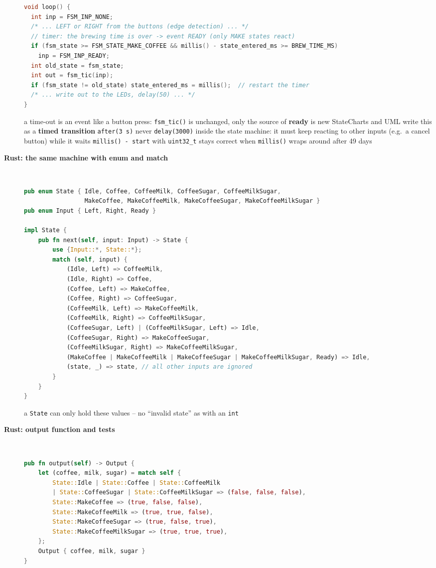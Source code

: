 \begin{description}
\begin{lstlisting}[language=C]
void loop() {
  int inp = FSM_INP_NONE;
  /* ... LEFT or RIGHT from the buttons (edge detection) ... */
  // timer: the brewing time is over -> event READY (only MAKE states react)
  if (fsm_state >= FSM_STATE_MAKE_COFFEE && millis() - state_entered_ms >= BREW_TIME_MS)
    inp = FSM_INP_READY;
  int old_state = fsm_state;
  int out = fsm_tic(inp);
  if (fsm_state != old_state) state_entered_ms = millis();  // restart the timer
  /* ... write out to the LEDs, delay(50) ... */
}
\end{lstlisting}
\bi
	\ite a time-out is an event like a button press: \texttt{fsm\_tic()} is unchanged, only the source of \textbf{ready} is new
	\ite StateCharts and UML write this as a \textbf{timed transition} \texttt{after(3 s)}
	\ite never \texttt{delay(3000)} inside the state machine: it must keep reacting to other inputs (e.g.\ a cancel button) while it waits
	\ite \texttt{millis() - start} with \texttt{uint32\_t} stays correct when \texttt{millis()} wraps around after 49 days
\ei
\os{\newpage}

\item[{\rot\bf Rust: the same machine with enum and match}]~\\[-\lstskip]
\begin{lstlisting}[language=Rust]
pub enum State { Idle, Coffee, CoffeeMilk, CoffeeSugar, CoffeeMilkSugar,
                 MakeCoffee, MakeCoffeeMilk, MakeCoffeeSugar, MakeCoffeeMilkSugar }
pub enum Input { Left, Right, Ready }

impl State {
    pub fn next(self, input: Input) -> State {
        use {Input::*, State::*};
        match (self, input) {
            (Idle, Left) => CoffeeMilk,
            (Idle, Right) => Coffee,
            (Coffee, Left) => MakeCoffee,
            (Coffee, Right) => CoffeeSugar,
            (CoffeeMilk, Left) => MakeCoffeeMilk,
            (CoffeeMilk, Right) => CoffeeMilkSugar,
            (CoffeeSugar, Left) | (CoffeeMilkSugar, Left) => Idle,
            (CoffeeSugar, Right) => MakeCoffeeSugar,
            (CoffeeMilkSugar, Right) => MakeCoffeeMilkSugar,
            (MakeCoffee | MakeCoffeeMilk | MakeCoffeeSugar | MakeCoffeeMilkSugar, Ready) => Idle,
            (state, _) => state, // all other inputs are ignored
        }
    }
}
\end{lstlisting}
\bi
	\ite a \texttt{State} can only hold these values -- no ``invalid state'' as with an \texttt{int}
\ei
\os{\newpage}

\item[{\rot\bf Rust: output function and tests}]~\\[-\lstskip]
\begin{lstlisting}[language=Rust]
pub fn output(self) -> Output {
    let (coffee, milk, sugar) = match self {
        State::Idle | State::Coffee | State::CoffeeMilk
        | State::CoffeeSugar | State::CoffeeMilkSugar => (false, false, false),
        State::MakeCoffee => (true, false, false),
        State::MakeCoffeeMilk => (true, true, false),
        State::MakeCoffeeSugar => (true, false, true),
        State::MakeCoffeeMilkSugar => (true, true, true),
    };
    Output { coffee, milk, sugar }
}


\end{lstlisting}
\end{description}
